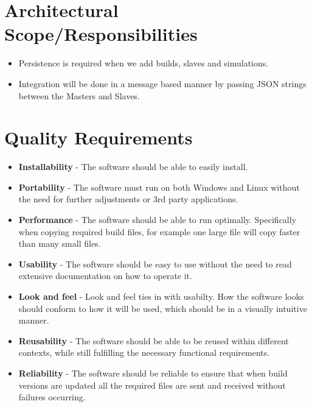 \documentclass[a4paper,12pt,final]{article}
\begin{document}

\newpage
\section{Architectural Scope/Responsibilities}
\begin{itemize}
\item Persistence is required when we add builds, slaves and simulations.
\item Integration will be done in a message based manner by passing JSON strings between the Masters and Slaves.
\end{itemize}


\section{Quality Requirements}
\begin{itemize}
  \item \textbf{Installability} - The software should be able to easily install.
\item \textbf{Portability} - The software must run on both Windows and Linux without the need for further adjustments or 3rd party applications.
\item \textbf{Performance} - The software should be able to run optimally. Specifically when copying required build files, for example one large file will copy faster than many small files.
\item \textbf{Usability} - The software should be easy to use without the need to read extensive documentation on how to operate it.
\item \textbf{Look and feel} - Look and feel ties in with usabilty. How the software looks should conform to how it will be used, which should be in a visually intuitive manner.
\item \textbf{Reusability} - The software should be able to be reused within different contexts, while still fulfilling the necessary functional requirements.
\item \textbf{Reliability} - The software should be reliable to ensure that when build versions are updated all the required files are sent and received without failures occurring.
\end{itemize}
\end{document}
